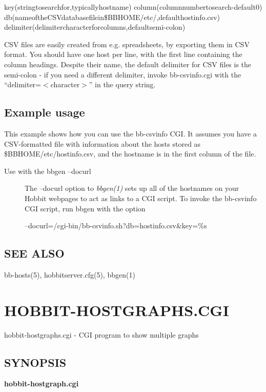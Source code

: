   
key(stringtosearchfor,typicallyhostname)  
column(columnnumbertosearch-default0)  
db(nameoftheCSVdatabasefilein\$BBHOME/etc/,defaulthostinfo.csv)  
delimiter(delimitercharacterforcolumns,defaultsemi-colon) 


  CSV files are easily created from e.g. spreadsheets, by exporting
  them in CSV format. You should have one host per line, with the
  first line containing the column headings. Despite their name, the
  default delimiter for CSV files is the semi-colon - if you need a
  different delimiter, invoke bb-csvinfo.cgi with the
  ``delimiter=$<$character$>$'' in the query string. 



 
\subsection{Example usage}
 This example shows how you can use the bb-csvinfo CGI. It assumes you
 have a CSV-formatted file with information about the hosts stored as
 \$BBHOME/etc/hostinfo.csv, and the hostname is in the first column of
 the file. 


 \begin{description}
\item[Use with the bbgen --docurl] The --docurl option to \emph{bbgen(1)}
 sets up all of the hostnames on your Hobbit webpages to act as links
 to a CGI script. To invoke the bb-csvinfo CGI script, run bbgen with
 the option 


  
--docurl=/cgi-bin/bb-csvinfo.sh?db=hostinfo.csv\&key=\%s 



\end{description}

\subsection{SEE ALSO}
bb-hosts(5), hobbitserver.cfg(5), bbgen(1) 

 
%
\newpage
\section{HOBBIT-HOSTGRAPHS.CGI}
 hobbit-hostgraphs.cgi - CGI program to show multiple graphs 

\subsection{SYNOPSIS}
\textbf{hobbit-hostgraph.cgi}


